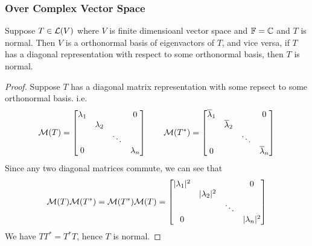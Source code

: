 \subsubsection{Over Complex Vector Space}
\begin{theorem}
	Suppose $T \in \mathcal L(V)$ where $V$ is finite dimensioanl vector space and $\mathbb F = \mathbb C$ and $T$ is normal. Then $V$ is a orthonormal basis of eigenvactors of $T$, and vice versa,  if $T$ has a diagonal representation with respect to some orthonormal basis, then $T$ is normal.
\end{theorem}
\begin{proof}
	Suppose $T$ has a diagonal matrix representation with some repsect to some orthonormal basis. i.e. 
	\[ \mathcal M(T) = \begin{bmatrix}
		\lambda_1 & & & 0 \\
		& \lambda_2 \\
		& & \ddots \\
		0& & & \lambda_n 
	\end{bmatrix}\qquad \mathcal M(T^*) = \begin{bmatrix}
		\overline \lambda_1 & & & 0 \\
		& \overline \lambda_2 \\
		& & \ddots \\
		0& & & \overline \lambda_n 
	\end{bmatrix}\]
	Since any two diagonal matrices commute, we can see that 
	\[ \mathcal M(T) \mathcal M(T^*) = \mathcal M(T^*) \mathcal M(T) =  \begin{bmatrix}
		|\lambda_1|^2 & & & 0 \\
		& |\lambda_2|^2 \\
		& & \ddots \\
		0& & & |\lambda_n|^2 
	\end{bmatrix}\]
	We have $TT^* = T^*T$, hence $T$ is normal.


\end{proof}
